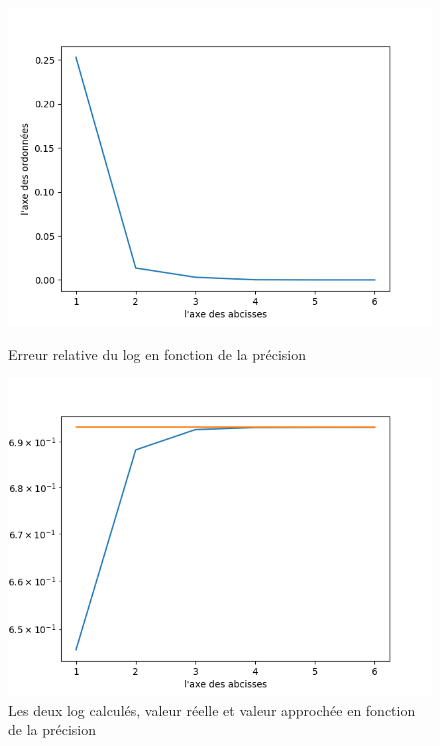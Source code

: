 \documentclass{article}
\begin{document}
\begin{figure}[ht]
    \begin{minipage}{0.48\textwidth}
        \centering
        \includegraphics[scale=0.5]{images/erreur_relative.png}
        \caption{Erreur relative du log en fonction de la précision}
        \label{fig:log_prec}
    \end{minipage}\hfill
    \begin{minipage}{0.48\textwidth}
        \centering
        \includegraphics[scale=0.5]{images/graphes_log.png}
        \caption{Les deux log calculés, valeur réelle et valeur approchée en fonction de la précision}
        \label{fig:compare_log}
    \end{minipage}
\end{figure}
\end{document}
